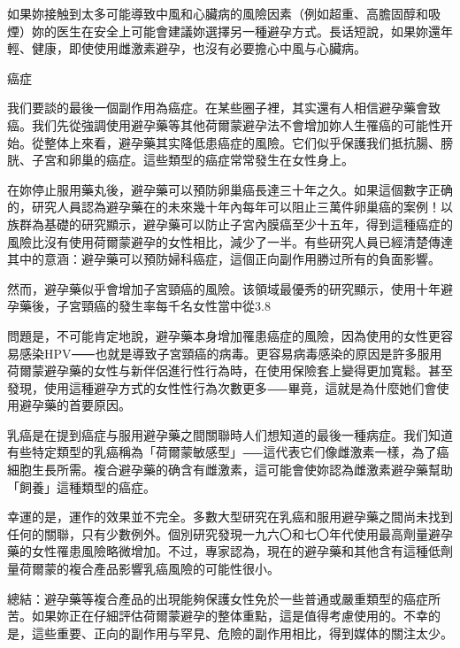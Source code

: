 \documentclass[12pt,UTF8]{ctexbook}
\begin{document}
如果妳接触到太多可能導致中風和心臟病的風險因素（例如超重、高膽固醇和吸煙）妳的医生在安全上可能會建議妳選擇另一種避孕方式。長话短說，如果妳還年輕、健康，即使使用雌激素避孕，也沒有必要擔心中風与心臟病。





癌症




我们要談的最後一個副作用為癌症。在某些圈子裡，其实還有人相信避孕藥會致癌。我们先從強調使用避孕藥等其他荷爾蒙避孕法不會增加妳人生罹癌的可能性开始。從整体上來看，避孕藥其实降低患癌症的風險。它们似乎保護我们抵抗腸、膀胱、子宮和卵巢的癌症。這些類型的癌症常常發生在女性身上。

在妳停止服用藥丸後，避孕藥可以預防卵巢癌長達三十年之久。如果這個數字正确的，研究人員認為避孕藥在的未來幾十年內每年可以阻止三萬件卵巢癌的案例！以族群為基礎的研究顯示，避孕藥可以防止子宮內膜癌至少十五年，得到這種癌症的風險比沒有使用荷爾蒙避孕的女性相比，減少了一半。有些研究人員已經清楚傳達其中的意涵：避孕藥可以預防婦科癌症，這個正向副作用勝过所有的負面影響。

然而，避孕藥似乎會增加子宮頸癌的風險。该領域最優秀的研究顯示，使用十年避孕藥後，子宮頸癌的發生率每千名女性當中從3.8%

問題是，不可能肯定地說，避孕藥本身增加罹患癌症的風險，因為使用的女性更容易感染HPV⸺也就是導致子宮頸癌的病毒。更容易病毒感染的原因是許多服用荷爾蒙避孕藥的女性与新伴侶進行性行為時，在使用保險套上變得更加寬鬆。甚至發現，使用這種避孕方式的女性性行為次數更多⸺畢竟，這就是為什麼她们會使用避孕藥的首要原因。

乳癌是在提到癌症与服用避孕藥之間關聯時人们想知道的最後一種病症。我们知道有些特定類型的乳癌稱為「荷爾蒙敏感型」⸺這代表它们像雌激素一樣，為了癌細胞生長所需。複合避孕藥的确含有雌激素，這可能會使妳認為雌激素避孕藥幫助「飼養」這種類型的癌症。

幸運的是，運作的效果並不完全。多數大型研究在乳癌和服用避孕藥之間尚未找到任何的關聯，只有少數例外。個別研究發現一九六〇和七〇年代使用最高劑量避孕藥的女性罹患風險略微增加。不过，專家認為，現在的避孕藥和其他含有這種低劑量荷爾蒙的複合產品影響乳癌風險的可能性很小。

總結：避孕藥等複合產品的出現能夠保護女性免於一些普通或嚴重類型的癌症所苦。如果妳正在仔細評估荷爾蒙避孕的整体重點，這是值得考慮使用的。不幸的是，這些重要、正向的副作用与罕見、危險的副作用相比，得到媒体的關注太少。
\end{document}
